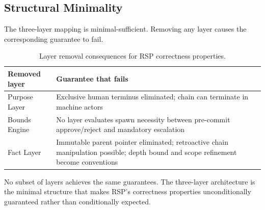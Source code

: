 \subsection{Structural Minimality}
\label{sec:rs-minimality}

The three-layer mapping is minimal-sufficient. Removing any layer causes the corresponding guarantee to fail.

\begin{table}[h]
\centering
\begin{tabular}{p{3.0cm} p{5.2cm}}
\toprule
\textbf{Removed layer} & \textbf{Guarantee that fails} \\
\midrule
Purpose Layer        & Exclusive human terminus eliminated; chain can terminate in machine actors \\
Bounds Engine        & No layer evaluates spawn necessity between pre-commit approve/reject and mandatory escalation \\
Fact Layer           & Immutable parent pointer eliminated; retroactive chain manipulation possible; depth bound and scope refinement become conventions \\
\bottomrule
\end{tabular}
\caption{Layer removal consequences for RSP correctness properties.}
\label{tab:layer-minimality}
\end{table}

No subset of layers achieves the same guarantees. The three-layer architecture is the minimal structure that makes RSP's correctness properties unconditionally guaranteed rather than conditionally expected.
